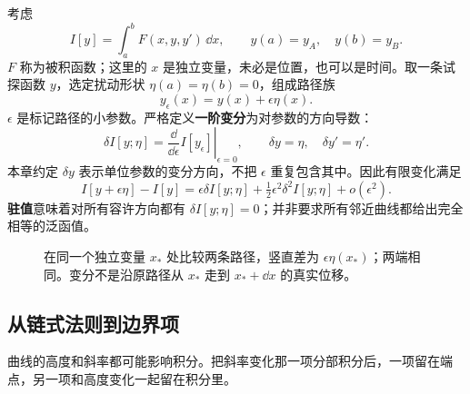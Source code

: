 考虑
\begin{equation}\label{eq:functional}
I[y]=\int_a^b F(x,y,y')\,\dd x,\qquad y(a)=y_A,\quad y(b)=y_B.
\end{equation}
$F$ 称为被积函数；这里的 $x$ 是独立变量，未必是位置，也可以是时间。取一条试探函数 $y$，选定扰动形状 $\eta(a)=\eta(b)=0$，组成路径族
\[
y_\epsilon(x)=y(x)+\epsilon\eta(x).
\]
$\epsilon$ 是标记路径的小参数。严格定义\textbf{一阶变分}为对参数的方向导数：
\begin{equation}\label{eq:var-definition}
\delta I[y;\eta]=\left.\frac{\dd}{\dd\epsilon}I[y_\epsilon]\right|_{\epsilon=0},
\qquad \delta y=\eta,\quad \delta y'=\eta'.
\end{equation}
本章约定 $\delta y$ 表示单位参数的变分方向，不把 $\epsilon$ 重复包含其中。因此有限变化满足
\[
I[y+\epsilon\eta]-I[y]=\epsilon\delta I[y;\eta]
+\tfrac12\epsilon^2\delta^2I[y;\eta]+o(\epsilon^2).
\]
\textbf{驻值}意味着对所有容许方向都有 $\delta I[y;\eta]=0$；并非要求所有邻近曲线都给出完全相等的泛函值。
\begin{figure}[htbp]
\centering
{}
\caption{在同一个独立变量 $x_*$ 处比较两条路径，竖直差为 $\epsilon\eta(x_*)$；两端相同。变分不是沿原路径从 $x_*$ 走到 $x_*+\dd x$ 的真实位移。}
\label{fig:var-neighbor-paths}
\end{figure}

\subsection{从链式法则到边界项}
曲线的高度和斜率都可能影响积分。把斜率变化那一项分部积分后，一项留在端点，另一项和高度变化一起留在积分里。

